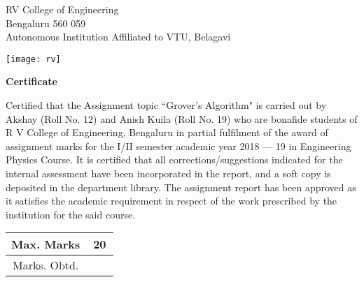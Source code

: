 \documentclass[a4paper]{article}
\begin{document}
\begin{titlepage}
   \begin{center}
       \vspace*{1cm}

       RV College of Engineering\\
       Bengaluru 560 059\\
       Autonomous Institution Affiliated to VTU, Belagavi

       \vspace{2.5cm}

       \texttt{[image: rv]}
       \vspace{0.5cm}

       \textbf{Certificate}
   \end{center}

       \vspace{0.5cm}

       Certified that the Assignment topic ``Grover’s Algorithm" is carried out
       by Akshay (Roll No. 12) and Anish Kuila (Roll No. 19) who are bonafide
       students of R V College of Engineering, Bengaluru in partial fulfilment
       of the award of assignment marks for the I/II semester academic year
       2018 --- 19 in Engineering Physics Course. It is certified that all
       corrections/suggestions indicated for the internal assessment have been
       incorporated in the report, and a soft copy is deposited in the
       department library. The assignment report has been approved as it
       satisfies the academic requirement in respect of the work prescribed by
       the institution for the said course.

       \vspace{1.5cm}

       \begin{table}[h!]
           \begin{tabular}{ |c|c| }
               \hline
               Max. Marks & 20\\
               \hline
               Marks. Obtd. & ~~~\\
               \hline
           \end{tabular}
       \end{table}

       \vspace{0.8cm}

\end{titlepage}

\tableofcontents
\pagebreak
\end{document}
